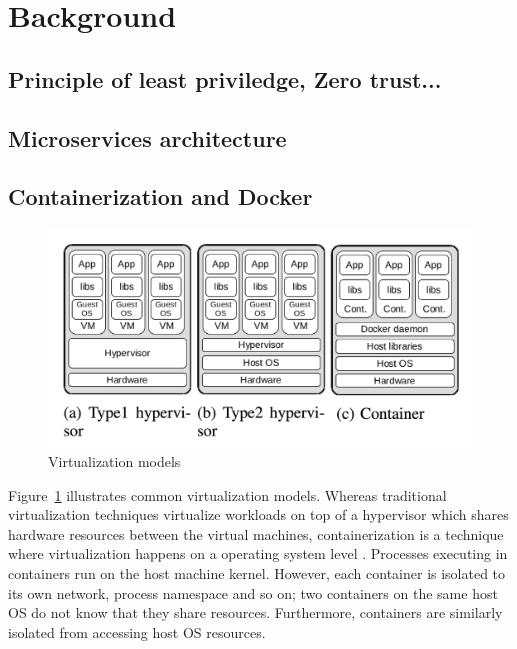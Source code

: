 \documentclass[english,12pt,a4paper,pdftex,sci,utf8]{aaltothesis}
\begin{document}
\clearpage

\section{Background} \label{section-bg}

\subsection{Principle of least priviledge, Zero trust...}

\subsection{Microservices architecture}
\subsection{Containerization and Docker}

\begin{figure}[h!]
  \centering
  \includegraphics[width=\linewidth]{files/figure-1.png}
  \caption{Virtualization models \cite{combe2016docker}}
  \label{figure-1}
\end{figure}

Figure~\ref{figure-1} illustrates common virtualization models. Whereas traditional virtualization techniques virtualize workloads on top of a hypervisor which shares hardware resources between the virtual machines, containerization is a technique where virtualization happens on a operating system level \cite{merkel2014docker}. Processes executing in containers run on the host machine kernel. However, each container is isolated to its own network, process namespace and so on; two containers on the same host OS do not know that they share resources. Furthermore, containers are similarly isolated from accessing host OS resources.
\end{document}
